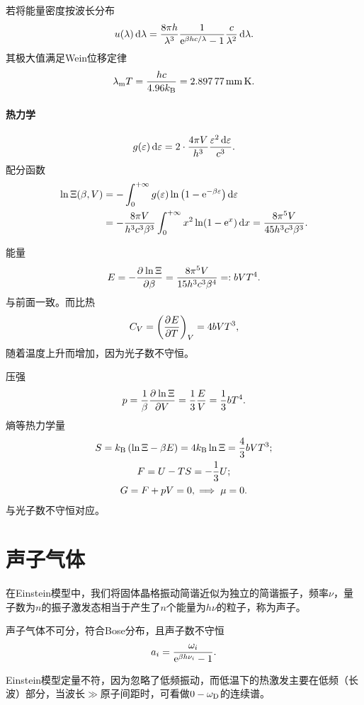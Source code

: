 若将能量密度按波长分布
\[
	u(\lambda)\mathop{}\!\mathrm{d}\lambda=\frac{8\pi h}{\lambda^3}\frac{1}{\mathop{}\!\mathrm{e}^{\beta hc/\lambda}-1}\frac c{\lambda^2}\mathop{}\!\mathrm{d}\lambda.
\]
其极大值满足Wein位移定律
\begin{align}
	\lambda_\mathrm mT=\frac{hc}{4.96\kB}=\SI{2.89777}{\mm\K}.
\end{align}
\paragraph{热力学}
\[
	g(\varepsilon)\mathop{}\!\mathrm{d}\varepsilon=2\cdot\frac{4\pi V}{h^3}\frac{\varepsilon^2\mathop{}\!\mathrm{d}\varepsilon}{c^3}.
\]
配分函数
\begin{align*}
	\ln\Xi(\beta,V)&=-\int_0^{+\infty} g(\varepsilon)\ln\left(1-\mathop{}\!\mathrm{e}^{-\beta\varepsilon}\right)\mathop{}\!\mathrm{d}\varepsilon\\
	&=-\frac{8\pi V}{h^3c^3\beta^3}\int_0^{+\infty} x^2\ln(1-\mathop{}\!\mathrm{e}^ x)\mathop{}\!\mathrm{d} x=\frac{8\pi^5V}{45h^3c^3\beta^3}.
\end{align*}

能量
\[
	E=-\frac{\partial^{{}}\ln\Xi}{\partial{\beta}^{{}}}=\frac{8\pi^5V}{15h^3c^3\beta^4}=:bVT^4.
\]
与前面一致。而比热
\[
	C_V=\left(\frac{\partial^{{}}E}{\partial{T}^{{}}}\right)_V=4bVT^3,
\]
随着温度上升而增加，因为光子数不守恒。

压强
\[
	p=\frac1\beta\frac{\partial^{{}}\ln\Xi}{\partial{V}^{{}}}=\frac13\frac EV=\frac13bT^4.
\]
熵等热力学量
\begin{gather*}
	S=k_{\mathrm B}\left(\ln\Xi-\beta E\right)=4k_{\mathrm B}\ln\Xi=\frac43bVT^3;\\
	F=U-TS=-\frac13U;\\
	G=F+pV=0,\implies\mu=0.
\end{gather*}
与光子数不守恒对应。
\section{声子气体}
在Einstein模型中，我们将固体晶格振动简谐近似为独立的简谐振子，频率$\nu$，量子数为$n$的振子激发态相当于产生了$n$个能量为$h\nu$的粒子，称为声子。

声子气体不可分，符合Bose分布，且声子数不守恒
\[
	a_i=\frac{\omega_i}{\mathop{}\!\mathrm{e}^{\beta h\nu_i}-1}.
\]

Einstein模型定量不符，因为忽略了低频振动，而低温下的热激发主要在低频（长波）部分，当波长$\gg$原子间距时，可看做$0-\omega_\mathrm D$的连续谱。


